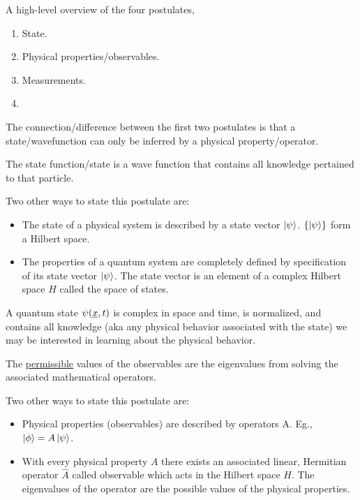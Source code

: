 \documentclass{school-22.101-notes}
\date{September 12, 2011}
\begin{document}
\maketitle

A high-level overview of the four postulates, 
\begin{enumerate}
\item State. 
\item Physical properties/observables. 
\item Measurements. 
\item 
\end{enumerate}
The connection/difference between the first two postulates is that a state/wavefunction can only be inferred by a physical property/operator. 


\begin{axiom} 
    The state function/state is a wave function that contains all knowledge pertained to that particle. 
\end{axiom}
Two other ways to state this postulate are: 
\begin{itemize}
\item The state of a physical system is described by a state vector $\left| \psi \right>$. $\left\{ \left| \psi \right> \right\}$ form a Hilbert space.
\item The properties of a quantum system are completely defined by specification of its state vector $\left| \psi \right>$. The state vector is an element of a complex Hilbert space $H$ called the space of states.
\end{itemize}
A quantum state $\psi(\underline{x}, t)$ is complex in space and time, is normalized, and contains all knowledge (aka any physical behavior associated with the state) we may be interested in learning about the physical behavior. 


\clearpage
{}
\begin{axiom} 
    The \uline{permissible} values of the observables are the eigenvalues from solving the associated mathematical operators.
\end{axiom}
Two other ways to state this postulate are:
\begin{itemize}
\item Physical properties (observables) are described by operators A. Eg., $\left| \phi \right> = A \left| \psi \right>$. 
\item With every physical property $A$ there exists an associated linear, Hermitian operator $\hat{A}$ called observable which acts in the Hilbert space $H$. The eigenvalues of the operator are the possible values of the physical properties.
\end{itemize}
\end{document}
